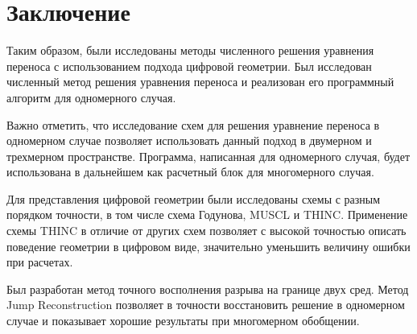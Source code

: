 \documentclass[12pt,a4paper]{article}
\begin{document}
\newpage
\section{Заключение}
Таким образом, были исследованы методы численного решения уравнения переноса с использованием подхода цифровой геометрии. Был исследован численный метод решения уравнения переноса и реализован его программный алгоритм для одномерного случая.

Важно отметить, что исследование схем для решения уравнение переноса в одномерном случае позволяет использовать данный подход в двумерном и трехмерном пространстве. Программа, написанная для одномерного случая, будет использована в дальнейшем как расчетный блок для многомерного случая.

Для представления цифровой геометрии были исследованы схемы с разным порядком точности, в том числе схема Годунова, MUSCL и THINC. Применение схемы THINC в отличие от других схем позволяет с высокой точностью описать поведение геометрии в цифровом виде, значительно уменьшить величину ошибки при расчетах.

Был разработан метод точного восполнения разрыва на границе двух сред. Метод Jump Reconstruction позволяет в точности восстановить решение в одномерном случае и показывает хорошие результаты при многомерном обобщении.
\end{document}

